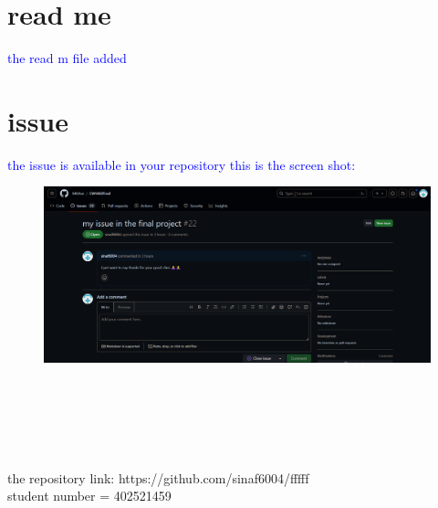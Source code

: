 \documentclass[titlepage]{article}
\begin{document}
\section{read me}
\textcolor{blue}{the read m file added}
\newpage
\section{issue}
\textcolor{blue}{the issue is available in your repository
this is the screen shot:}
\begin{figure}[h]
\centering
\includegraphics[width = 1.2\textwidth]{issue}
\end {figure}
\\\\\\\\\\the repository link: https://github.com/sinaf6004/fffff
\\student number = 402521459
\end{document}
